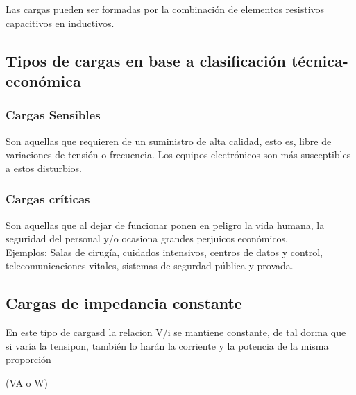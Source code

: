 \documentclass[]{article}
\begin{document}
Las cargas pueden ser formadas por la combinación de elementos resistivos capacitivos en inductivos.\\

\subsection{Tipos de cargas en base a clasificación técnica-económica} 

\subsubsection{Cargas Sensibles} 

Son aquellas que requieren de un suministro de alta calidad, esto es, libre de variaciones de tensión o frecuencia. Los equipos electrónicos son más susceptibles a estos disturbios.\\

\subsubsection{Cargas críticas} 

Son aquellas que al dejar de funcionar ponen en peligro la vida humana, la seguridad del personal y/o ocasiona grandes perjuicos económicos.\\

Ejemplos: Salas de cirugía, cuidados intensivos, centros de datos y control, telecomunicaciones vitales, sistemas de segurdad pública y provada.\\

\subsection{Cargas de impedancia constante}

En este tipo de cargasd la relacion V/i se mantiene constante, de tal dorma que si varía la tensipon, también lo harán la corriente y la potencia de la misma proporción

(VA o W)

\end{document}

